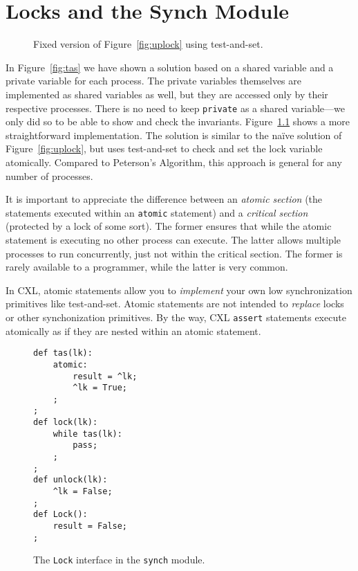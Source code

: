 \documentclass{report}
\newenvironment{code}{
\tcolorbox
}{
\endtcolorbox
}
\begin{document}
\chapter{Locks and the Synch Module}

\begin{figure}
\begin{code}

\end{code}
\caption{Fixed version of Figure~\ref{fig:uplock} using test-and-set.}
\label{fig:tas2}
\end{figure}

In Figure~\ref{fig:tas} we have shown a solution based on a shared
variable and a private variable for each process.   The private
variables themselves are implemented as shared variables as well,
but they are accessed only by their respective processes.
There is no need to keep \texttt{private} as a shared
variable---we only did so to be able to show and check the invariants.
Figure~\ref{fig:tas2} shows a more straightforward implementation.
The solution is similar to the na\"{i}ve solution of Figure~\ref{fig:uplock},
but uses test-and-set to check and set the lock variable atomically.
Compared to Peterson's Algorithm, this approach is general for
any number of processes.

It is important to appreciate the difference between an
\emph{atomic section} (the statements executed within an
\texttt{atomic} statement) and a \emph{critical section}
(protected by a lock of some sort).
The former ensures that while the
atomic statement is executing no other process can execute.
The latter allows multiple processes to run concurrently,
just not within the critical section.
The former is rarely available to a programmer, while the latter
is very common.

In CXL, atomic statements allow you to \emph{implement} your own
low synchronization primitives like test-and-set.  Atomic statements
are not intended to \emph{replace} locks or other synchonization primitives.
By the way, CXL \texttt{assert} statements execute atomically
as if they are nested within an atomic statement.

\begin{figure}
\begin{code}
\begin{verbatim}
def tas(lk):
    atomic:
        result = ^lk;
        ^lk = True;
    ;
;
def lock(lk):
    while tas(lk):
        pass;
    ;
;
def unlock(lk):
    ^lk = False;
;
def Lock():
    result = False;
;
\end{verbatim}
\end{code}
\caption{The \texttt{Lock} interface in the \texttt{synch} module.}
\label{fig:locks}
\end{figure}
\end{document}
